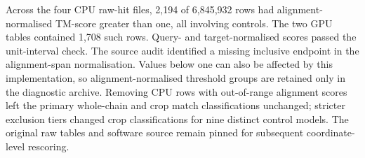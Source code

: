 Across the four CPU raw-hit files, 2{,}194 of 6{,}845{,}932 rows had alignment-normalised
TM-score greater than one, all involving controls. The two GPU tables contained 1{,}708 such
rows. Query- and target-normalised scores passed the unit-interval check. The source audit
identified a missing inclusive endpoint in the alignment-span normalisation. Values below one
can also be affected by this implementation, so alignment-normalised threshold groups are
retained only in the diagnostic archive. Removing CPU rows with out-of-range alignment scores
left the primary whole-chain and crop match classifications unchanged; stricter exclusion tiers
changed crop classifications for nine distinct control models. The original raw tables and
software source remain pinned for subsequent coordinate-level rescoring.

